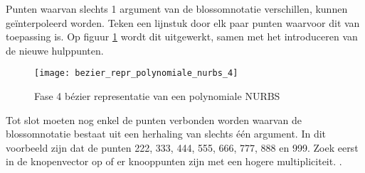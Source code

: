 \documentclass{report}
\begin{document}
\begin{itemize}
{\begin{itemize}
			Punten waarvan slechts 1 argument van de blossomnotatie verschillen, kunnen geïnterpoleerd worden. Teken een lijnstuk door elk paar punten waarvoor dit van toepassing is. Op figuur \ref{fig:bezier_repr_polynomiale_nurbs_4} wordt dit uitgewerkt, samen met het introduceren van de nieuwe hulppunten.
			\begin{figure}[ht]
				\centering
				\texttt{[image: bezier\_repr\_polynomiale\_nurbs\_4]}	
				\caption{Fase 4 bézier representatie van een polynomiale NURBS}
				\label{fig:bezier_repr_polynomiale_nurbs_4}
			\end{figure}

			Tot slot moeten nog enkel de punten verbonden worden waarvan de blossomnotatie bestaat uit een herhaling van slechts één argument. In dit voorbeeld zijn dat de punten 222, 333, 444, 555, 666, 777, 888 en 999. Zoek eerst in de knopenvector op of er knooppunten zijn met een hogere multipliciteit. .
			

\end{itemize}}
\end{itemize}
\end{document}
